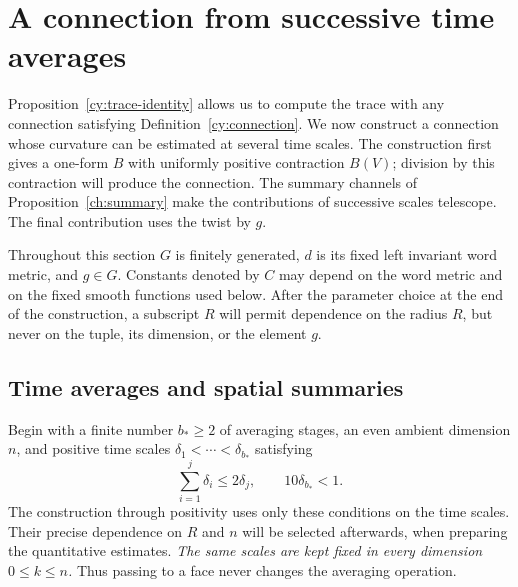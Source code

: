 \section{A connection from successive time averages}
\label{sec:connection}

Proposition~\ref{cy:trace-identity} allows us to compute the trace with any
connection satisfying Definition~\ref{cy:connection}.  We now construct a
connection whose curvature can be estimated at several time scales.  The
construction first gives a one-form $B$ with uniformly positive contraction
$B(V)$; division by this contraction will produce the connection.  The
summary channels of Proposition~\ref{ch:summary} make the contributions of
successive scales telescope.  The final contribution uses the twist by $g$.

Throughout this section $G$ is finitely generated, $d$ is its fixed left
invariant word metric, and $g\in G$.  Constants denoted by $C$ may depend on
the word metric and on the fixed smooth functions used below.  After the
parameter choice at the end of the construction, a subscript $R$ will
permit dependence on the radius $R$, but never on the tuple, its
dimension, or the element $g$.

\subsection{Time averages and spatial summaries}

Begin with a finite number $b_*\geq2$ of averaging stages, an even ambient
dimension $n$, and positive time scales $\delta_1<\cdots<\delta_{b_*}$
satisfying
\begin{equation}
 \sum_{i=1}^j\delta_i\leq2\delta_j,
 \qquad 10\delta_{b_*}<1.
 \label{co:scale-support}
\end{equation}
The construction through positivity uses only these conditions on the
time scales.  Their precise dependence on $R$ and $n$ will be selected
afterwards, when preparing the quantitative estimates.
\emph{The same scales are kept fixed in every dimension $0\leq k\leq n$.}
Thus passing to a face never changes the averaging operation.

